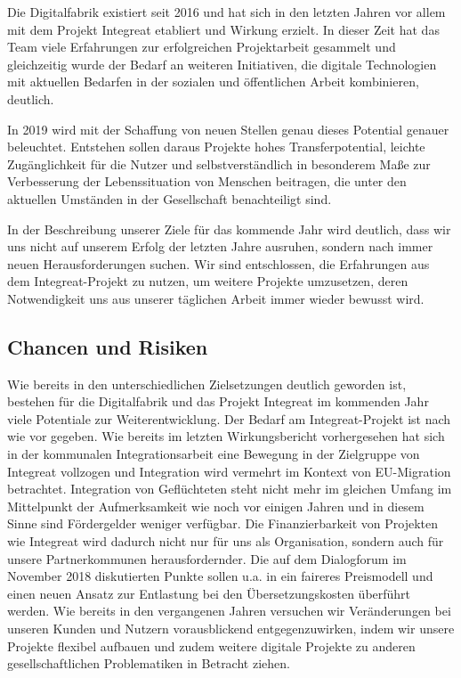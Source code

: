 \documentclass[12pt, a4paper]{article} %
\begin{document}
Die Digitalfabrik existiert seit 2016 und hat sich in den letzten Jahren
vor allem mit dem Projekt Integreat etabliert und Wirkung erzielt. In
dieser Zeit hat das Team viele Erfahrungen zur erfolgreichen
Projektarbeit gesammelt und gleichzeitig wurde der Bedarf an weiteren
Initiativen, die digitale Technologien mit aktuellen Bedarfen in der
sozialen und öffentlichen Arbeit kombinieren, deutlich.

In 2019 wird mit der Schaffung von neuen Stellen genau dieses Potential
genauer beleuchtet. Entstehen sollen daraus Projekte hohes
Transferpotential, leichte Zugänglichkeit für die Nutzer und
selbstverständlich in besonderem Maße zur Verbesserung der
Lebenssituation von Menschen beitragen, die unter den aktuellen
Umständen in der Gesellschaft benachteiligt sind.

In der Beschreibung unserer Ziele für das kommende Jahr wird deutlich,
dass wir uns nicht auf unserem Erfolg der letzten Jahre ausruhen,
sondern nach immer neuen Herausforderungen suchen. Wir sind
entschlossen, die Erfahrungen aus dem Integreat-Projekt zu nutzen, um
weitere Projekte umzusetzen, deren Notwendigkeit uns aus unserer
täglichen Arbeit immer wieder bewusst wird.

\hypertarget{chancen-und-risiken}{%
\subsection{Chancen und Risiken}\label{chancen-und-risiken}}

Wie bereits in den unterschiedlichen Zielsetzungen deutlich geworden
ist, bestehen für die Digitalfabrik und das Projekt Integreat im
kommenden Jahr viele Potentiale zur Weiterentwicklung. Der Bedarf am
Integreat-Projekt ist nach wie vor gegeben. Wie bereits im letzten
Wirkungsbericht vorhergesehen hat sich in der kommunalen
Integrationsarbeit eine Bewegung in der Zielgruppe von Integreat
vollzogen und Integration wird vermehrt im Kontext von EU-Migration
betrachtet. Integration von Geflüchteten steht nicht mehr im gleichen
Umfang im Mittelpunkt der Aufmerksamkeit wie noch vor einigen Jahren und
in diesem Sinne sind Fördergelder weniger verfügbar. Die
Finanzierbarkeit von Projekten wie Integreat wird dadurch nicht nur für
uns als Organisation, sondern auch für unsere Partnerkommunen
herausfordernder. Die auf dem Dialogforum im November 2018 diskutierten
Punkte sollen u.a. in ein faireres Preismodell und einen neuen Ansatz
zur Entlastung bei den Übersetzungskosten überführt werden. Wie bereits
in den vergangenen Jahren versuchen wir Veränderungen bei unseren Kunden
und Nutzern vorausblickend entgegenzuwirken, indem wir unsere Projekte
flexibel aufbauen und zudem weitere digitale Projekte zu anderen
gesellschaftlichen Problematiken in Betracht ziehen.
\end{document}
